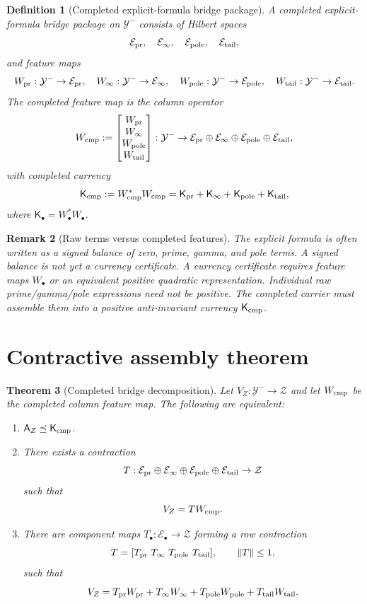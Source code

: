 \documentclass[11pt]{article}
\newtheorem{theorem}{Theorem}[section]
\newtheorem{definition}[theorem]{Definition}
\newtheorem{remark}[theorem]{Remark}
\newcommand{\K}{\mathsf K}
\newcommand{\A}{\mathsf A}
\newcommand{\Y}{\mathcal Y}
\begin{document}
\begin{definition}[Completed explicit-formula bridge package]
A completed explicit-formula bridge package on \(\Y^-\) consists of Hilbert spaces
\[
  \mathcal E_{\rm pr},\quad
  \mathcal E_{\infty},\quad
  \mathcal E_{\rm pole},\quad
  \mathcal E_{\rm tail},
\]
and feature maps
\[
  W_{\rm pr}:\Y^-\to\mathcal E_{\rm pr},
  \quad
  W_\infty:\Y^-\to\mathcal E_\infty,
  \quad
  W_{\rm pole}:\Y^-\to\mathcal E_{\rm pole},
  \quad
  W_{\rm tail}:\Y^-\to\mathcal E_{\rm tail}.
\]
The completed feature map is the column operator
\[
  W_{\rm cmp}
  :=
  \begin{bmatrix}
    W_{\rm pr}\\ W_\infty\\ W_{\rm pole}\\ W_{\rm tail}
  \end{bmatrix}
  :\Y^-\to
  \mathcal E_{\rm pr}\oplus\mathcal E_\infty\oplus\mathcal E_{\rm pole}\oplus\mathcal E_{\rm tail},
\]
with completed currency
\[
  \K_{\rm cmp}
  :=W_{\rm cmp}^*W_{\rm cmp}
  =\K_{\rm pr}+\K_\infty+\K_{\rm pole}+\K_{\rm tail},
\]
where \(\K_\bullet=W_\bullet^*W_\bullet\).
\end{definition}

\begin{remark}[Raw terms versus completed features]
The explicit formula is often written as a signed balance of zero, prime, gamma, and pole terms. A signed balance is not yet a currency certificate. A currency certificate requires feature maps \(W_\bullet\) or an equivalent positive quadratic representation. Individual raw prime/gamma/pole expressions need not be positive. The completed carrier must assemble them into a positive anti-invariant currency \(\K_{\rm cmp}\).
\end{remark}

\section{Contractive assembly theorem}

\begin{theorem}[Completed bridge decomposition]
Let \(V_Z:\Y^-\to\mathcal Z\) and let \(W_{\rm cmp}\) be the completed column feature map. The following are equivalent:
\begin{enumerate}[label=(\roman*)]
  \item \(\A_Z\preceq \K_{\rm cmp}\).
  \item There exists a contraction
  \[
    T:\mathcal E_{\rm pr}\oplus\mathcal E_\infty\oplus\mathcal E_{\rm pole}\oplus\mathcal E_{\rm tail}\to \mathcal Z
  \]
  such that
  \[
    V_Z=T W_{\rm cmp}.
  \]
  \item There are component maps \(T_\bullet:\mathcal E_\bullet\to\mathcal Z\) forming a row contraction
  \[
    T=[T_{\rm pr}\ T_\infty\ T_{\rm pole}\ T_{\rm tail}],
    \qquad \|T\|\le1,
  \]
  such that
  \[
    V_Z=T_{\rm pr}W_{\rm pr}+T_\infty W_\infty+T_{\rm pole}W_{\rm pole}+T_{\rm tail}W_{\rm tail}.
  \]
\end{enumerate}
\end{theorem}
\end{document}
